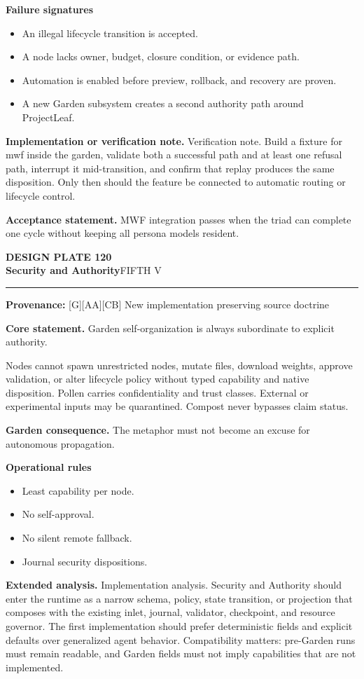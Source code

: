 \documentclass[10pt,letterpaper,oneside]{article}
\newcommand{\prov}[1]{\textcolor{gardenBlue}{\sffamily\footnotesize\textbf{Provenance:} #1}}
\newcommand{\platetitle}[3]{%
  \begin{minipage}[t][0.54in][t]{\textwidth}
  {\sffamily\bfseries\color{gardenDeep}\fontsize{9}{10}\selectfont DESIGN PLATE #1}\\[-1pt]
  {\sffamily\bfseries\color{gardenInk}\fontsize{16.5}{18}\selectfont #2}\hfill{\sffamily\color{gardenGreen}\large #3}
  \end{minipage}\vspace{-2pt}\hrule\vspace{5pt}}
\begin{document}
\textbf{Failure signatures}
\begin{itemize}
\item An illegal lifecycle transition is accepted.
\item A node lacks owner, budget, closure condition, or evidence path.
\item Automation is enabled before preview, rollback, and recovery are proven.
\item A new Garden subsystem creates a second authority path around ProjectLeaf.
\end{itemize}
\textbf{Implementation or verification note.} Verification note. Build a fixture for mwf inside the garden, validate both a successful path and at least one refusal path, interrupt it mid-transition, and confirm that replay produces the same disposition. Only then should the feature be connected to automatic routing or lifecycle control.

\begin{acceptbox}
\textbf{Acceptance statement.} MWF integration passes when the triad can complete one cycle without keeping all persona models resident.
\end{acceptbox}
\newpage
\platetitle{120}{Security and Authority}{FIFTH V}
\prov{[G][AA][CB] New implementation preserving source doctrine}
\fontsize{8.85}{10.45}\selectfont
\begin{corebox}
\textbf{Core statement.} Garden self-organization is always subordinate to explicit authority.
\end{corebox}
Nodes cannot spawn unrestricted nodes, mutate files, download weights, approve validation, or alter lifecycle policy without typed capability and native disposition. Pollen carries confidentiality and trust classes. External or experimental inputs may be quarantined. Compost never bypasses claim status.

\textbf{Garden consequence.} The metaphor must not become an excuse for autonomous propagation.

\textbf{Operational rules}
\begin{itemize}
\item Least capability per node.
\item No self-approval.
\item No silent remote fallback.
\item Journal security dispositions.
\end{itemize}
\textbf{Extended analysis.} Implementation analysis. Security and Authority should enter the runtime as a narrow schema, policy, state transition, or projection that composes with the existing inlet, journal, validator, checkpoint, and resource governor. The first implementation should prefer deterministic fields and explicit defaults over generalized agent behavior. Compatibility matters: pre-Garden runs must remain readable, and Garden fields must not imply capabilities that are not implemented.
\end{document}
